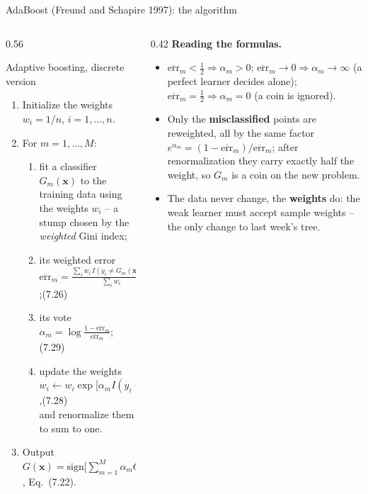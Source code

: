 \documentclass[10pt,aspectratio=169]{beamer}
\newcommand{\err}{\overline{\mathrm{err}}}
\newcommand{\sgn}{\mathrm{sign}}
\begin{document}
\begin{frame}{AdaBoost (Freund and Schapire 1997): the algorithm}
\begin{columns}[T]
\begin{column}{0.56\textwidth}
\footnotesize
\begin{block}{Adaptive boosting, discrete version}
\footnotesize
\begin{enumerate}
  \item Initialize the weights $w_i=1/n$, $i=1,\dots,n$.
  \item For $m=1,\dots,M$:
  \begin{enumerate}
    \item[(a)] fit a classifier $G_m(\bm{x})$ to the training data using the
      weights $w_i$ -- a stump chosen by the \emph{weighted} Gini index;
    \item[(b)] its weighted error\quad
      $\displaystyle\err_m=\frac{\sum_i w_i\, I(y_i\neq G_m(\bm{x}_i))}{\sum_i w_i}$;\hfill(7.26)
    \item[(c)] its vote\quad
      $\displaystyle\alpha_m=\log\frac{1-\err_m}{\err_m}$;\hfill(7.29)
    \item[(d)] update the weights\quad
      $w_i\leftarrow w_i\exp\big[\alpha_m I(y_i\neq G_m(\bm{x}_i))\big]$,\hfill(7.28)\\
      and renormalize them to sum to one.
  \end{enumerate}
  \item Output $G(\bm{x})=\sgn\big[\sum_{m=1}^M\alpha_m G_m(\bm{x})\big]$,
    Eq.\ (7.22).
\end{enumerate}
\end{block}
\end{column}
\begin{column}{0.42\textwidth}
\footnotesize
\textbf{Reading the formulas.}
\begin{itemize}
  \item $\err_m<\frac12\Rightarrow\alpha_m>0$; $\err_m\to0\Rightarrow\alpha_m\to\infty$
    (a perfect learner decides alone); $\err_m=\frac12\Rightarrow\alpha_m=0$
    (a coin is ignored).
  \item Only the \textbf{misclassified} points are reweighted, all by the
    same factor $e^{\alpha_m}=(1-\err_m)/\err_m$; after renormalization they
    carry exactly half the weight, so $G_m$ is a coin on the new problem.
  \item The data never change, the \textbf{weights} do: the weak learner
    must accept sample weights -- the only change to last week's tree.
\end{itemize}
\end{column}
\end{columns}
\end{frame}
\end{document}
